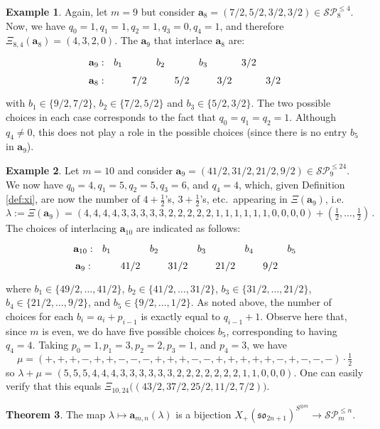 \documentclass[10pt]{amsart}
\numberwithin{equation}{section}
\theoremstyle{definition}
\newtheorem{thm}{Theorem}[section]
\newtheorem{example}[thm]{Example}
\newcommand{\son}[1][2n+1]{\mathfrak{so}_{#1}}
\newcommand{\ab}{\mathbf{a}}
\newcommand{\SP}{\mathcal{SP}}
\begin{document}
\begin{example}
Again, let $m=9$ but consider $\ab_8=(7/2, 5/2, 3/2, 3/2) \in \SP_{8}^{\le 4}$. 
Now, we have $q_0=1, q_1=1, q_2=1, q_3=0, q_4=1$, and therefore
$\Xi_{8,4}(\ab_8) = (4,3,2,0)$. 
The $\ab_9$ that interlace $\ab_8$ are:
\[
\begin{tikzcd}[column sep = 0.1 em, row sep =0.1 em]
\ab_9: & b_1 & & b_2 & & b_3 & & 3/2 &  \\
\ab_8: &  & 7/2 & & 5/2 & & 3/2 & & 3/2
	\end{tikzcd}
	\]
with $b_1 \in \{9/2,7/2\}$, $b_2 \in \{7/2,5/2\}$ and $b_3 \in \{5/2,3/2\}$. 
The two possible choices in each case corresponds to the fact that $q_0=q_1=q_2=1$.
Although $q_4 \neq 0$, this does not play a role in the possible choices 
(since there is no entry $b_5$ in $\ab_9$).
	\end{example}

\begin{example} 
Let $m=10$ and consider 
$\ab_9 = (41/2, 31/2, 21/2, 9/2)\in \SP_9^{\le 24}$. 
We now have $q_0=4, q_1=5, q_2=5, q_3=6$, and $q_4=4$, 
which, given Definition \ref{def:xi}, are now the number of $4+\tfrac{1}{2}$'s, $3+\tfrac{1}{2}$'s, 
etc.~appearing in $\Xi(\ab_9)$, i.e.
\[
\lambda := \Xi(\ab_9) = (4,4,4,4,3,3,3,3,3,2,2,2,2,2,1,1,1,1,1,1,0,0,0,0) + (\tfrac{1}{2},\ldots,\tfrac{1}{2}) \, .
	\]
The choices of interlacing $\ab_{10}$ are indicated as follows:
\[
\begin{tikzcd}[column sep = 0.1 em, row sep =0.1 em]
\ab_{10}: & b_1 & & b_2 & & b_3 & & b_4 && b_5  \\
\ab_9: &  & 41/2 & & 31/2 & & 21/2 & & 9/2 &
	\end{tikzcd}
	\]
where 
$b_1 \in \{49/2, \ldots, 41/2\}$, 
$b_2 \in \{41/2, \ldots, 31/2\}$, 
$b_3 \in \{31/2, \ldots, 21/2\}$, 
$b_4 \in \{21/2, \ldots, 9/2\}$,
and $b_5 \in \{9/2,\ldots,1/2\}$.
As noted above, the number of choices for each $b_i=a_{i}+p_{i-1}$ 
is exactly equal to $q_{i-1}+1$. 
Observe here that, since $m$ is even, 
we do have five possible choices $b_5$, 
corresponding to having $q_4=4$.
Taking $p_0=1, p_1=3, p_2=2, p_3=1$, and $p_4=3$, we have
\[
\mu = (+,+,+,-,+,+,-,-,-,+,+,+,-,-,+,+,+,+,+,-,+,-,-,-) \cdot \tfrac{1}{2}
\]
so
$\lambda + \mu = (5,5,5,4,4,4,3,3,3,3,3,3,2,2,2,2,2,2,2,1,1,0,0,0)$.
One can easily verify that this equals 
$\Xi_{10,24}\big( (43/2, 37/2, 25/2,11/2, 7/2) \big)$.
\end{example}

\begin{thm}\label{thm:bijection}
The map $\lambda \mapsto \ab_{m,n}(\lambda)$ 
is a bijection $X_+(\son)^{S^{\otimes m}}\longrightarrow \SP_m^{\le n}$.
\end{thm}
\end{document}
